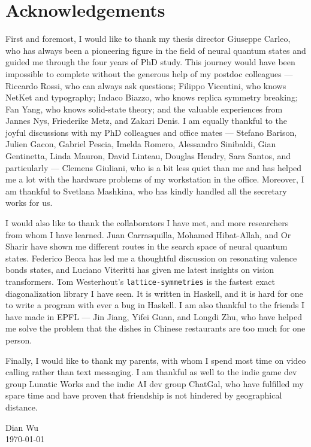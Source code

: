 \chapter*{Acknowledgements}

First and foremost, I would like to thank my thesis director Giuseppe Carleo, who has always been a pioneering figure in the field of neural quantum states and guided me through the four years of PhD study.
This journey would have been impossible to complete without the generous help of my postdoc colleagues --- Riccardo Rossi, who can always ask questions; Filippo Vicentini, who knows NetKet and typography; Indaco Biazzo, who knows replica symmetry breaking; Fan Yang, who knows solid-state theory; and the valuable experiences from Jannes Nys, Friederike Metz, and Zakari Denis.
I am equally thankful to the joyful discussions with my PhD colleagues and office mates --- Stefano Barison, Julien Gacon, Gabriel Pescia, Imelda Romero, Alessandro Sinibaldi, Gian Gentinetta, Linda Mauron, David Linteau, Douglas Hendry, Sara Santos, and particularly --- Clemens Giuliani, who is a bit less quiet than me and has helped me a lot with the hardware problems of my workstation in the office.
Moreover, I am thankful to Svetlana Mashkina, who has kindly handled all the secretary works for us.

I would also like to thank the collaborators I have met, and more researchers from whom I have learned.
Juan Carrasquilla, Mohamed Hibat-Allah, and Or Sharir have shown me different routes in the search space of neural quantum states.
Federico Becca has led me a thoughtful discussion on resonating valence bonds states, and Luciano Viteritti has given me latest insights on vision transformers.
Tom Westerhout's \texttt{lattice-symmetries} is the fastest exact diagonalization library I have seen. It is written in Haskell, and it is hard for one to write a program with ever a bug in Haskell.
I am also thankful to the friends I have made in EPFL --- Jin Jiang, Yifei Guan, and Longdi Zhu, who have helped me solve the problem that the dishes in Chinese restaurants are too much for one person.

Finally, I would like to thank my parents, with whom I spend most time on video calling rather than text messaging.
I am thankful as well to the indie game dev group Lunatic Works and the indie AI dev group ChatGal, who have fulfilled my spare time and have proven that friendship is not hindered by geographical distance.

\begin{flushright}
Dian Wu \\
\today
\end{flushright}
